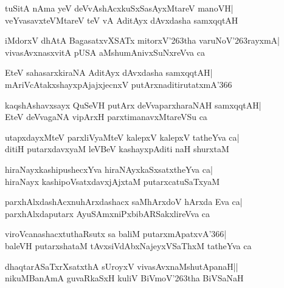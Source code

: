 \documentclass[twoside,12pt,openright]{book}
\def\S{\char'263}
\newcounter{shloka}[chapter]
\begin{document}
\begin{shloka}%
tuSitA nAma yeV deVvAshAcxkuSxSasAyxMtareV manoVH|\\
veYvasavxteVMtareV teV vA AditAyx dAvxdasha samxqqtAH
\end{shloka}

\begin{shloka}%
iMdorxV dhAtA BagasatxvXSATx mitorxV\S tha varuNoV\S rayxmA|\\
vivasAvxnasxvitA pUSA aMshumAnivxSuNxreVva ca
\end{shloka}

\begin{shloka}%
EteV sahasarxkiraNA AditAyx dAvxdasha samxqqtAH|\\
mAriVcAtakxshayxpAjajxjecnxV putArxnaditirutatxmA\char'366
\end{shloka}

\begin{shloka}%
kaqshAshavxsayx QuSeVH putArx deVvaparxharaNAH samxqqtAH|\\
EteV deVvagaNA vipArxH parxtimanavxMtareVSu ca
\end{shloka}

\begin{shloka}%
utapxdayxMteV parxliVyaMteV kalepxV kalepxV tatheYva ca|\\
ditiH putarxdavxyaM leVBeV kashayxpAditi naH shurxtaM
\end{shloka}

\begin{shloka}%
hiraNayxkashipushecxYva hiraNAyxkaSxsatxtheYva ca|\\
hiraNayx kashipoVsatxdavxjAjxtaM putarxcatuSaTxyaM
\end{shloka}

\begin{shloka}%
parxhAlxdashAcxnuhArxdashacx saMhArxdoV hArxda Eva ca|\\
parxhAlxdaputarx AyuSAmxniPxbibARSakxlireVva ca
\end{shloka}

\begin{shloka}%
viroVcanashacxtuthaRsutx sa baliM putarxmApatxvA\char'366|\\
baleVH putarxshataM tAvxsiVdAbxNajeyxVSaThxM tatheYva ca
\end{shloka}

\begin{shloka}%
dhaqtarASaTxrXsatxthA sUroyxV vivasAvxnaMshutApanaH||\\
nikuMBanAmA guvaRkaSxH kuliV BiVmoV\S tha BiVSaNaH
\end{shloka}
\end{document}
